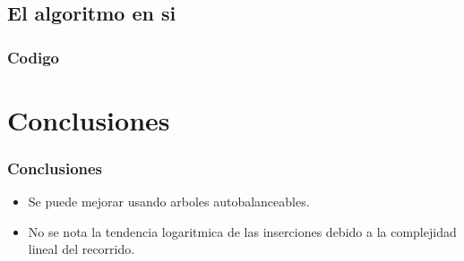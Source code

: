 \documentclass{beamer}
\begin{document}
\subsection{El algoritmo en si}

\begin{frame}
\frametitle{Codigo}
	
\end{frame}

\section{Conclusiones}

\begin{frame}
\frametitle{Conclusiones}
	\begin{itemize}
	\item Se puede mejorar usando arboles autobalanceables.
	\item No se nota la tendencia logaritmica de las inserciones debido a la complejidad lineal del recorrido.
	\end{itemize}
\end{frame}
\end{document}
